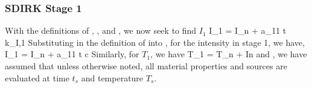 \subsubsection{SDIRK Stage 1}
With the definitions of , , and , we now seek to find $I_1$
\benum
I_1 = I_n + a_{11} \Delta t k_{I,1} \pep
\label{eq:chap6_early}
\eenum
Substituting in the definition of  into , for the intensity in stage 1, we have,
\benum
I_1 = I_n + a_{11} \Delta t c  
\pep
\label{eq:i_1_start}
\eenum
Similarly, for $T_1$, we have
\benum
T_1 = T_n +  \pep
\label{eq:t_1_start}
\eenum
In  and , we have assumed that unless otherwise noted, all material properties and sources are evaluated at time $t_s$ and temperature $T_s$.


